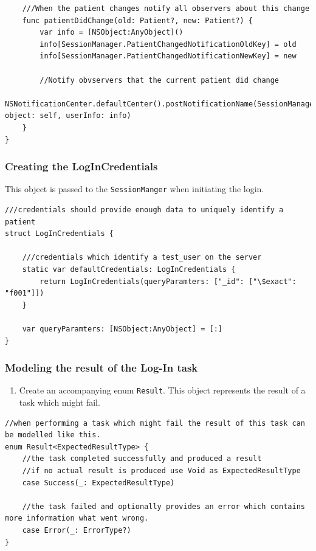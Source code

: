 \documentclass{article}
\begin{document}
\begin{enumerate}
\begin{verbatim}
    ///When the patient changes notify all observers about this change
    func patientDidChange(old: Patient?, new: Patient?) {
        var info = [NSObject:AnyObject]()
        info[SessionManager.PatientChangedNotificationOldKey] = old
        info[SessionManager.PatientChangedNotificationNewKey] = new

        //Notify obvservers that the current patient did change
        NSNotificationCenter.defaultCenter().postNotificationName(SessionManager.PatientChangedNotification, object: self, userInfo: info)
    }
}

\end{verbatim}

\end{enumerate}

\subsubsection{Creating the LogInCredentials}

This object is passed to the \texttt{SessionManger} when initiating the login.

\begin{verbatim}
///credentials should provide enough data to uniquely identify a patient
struct LogInCredentials {

    ///credentials which identify a test_user on the server
    static var defaultCredentials: LogInCredentials {
        return LogInCredentials(queryParamters: ["_id": ["\$exact": "f001"]])
    }

    var queryParamters: [NSObject:AnyObject] = [:]
}
\end{verbatim}

\subsubsection{Modeling the result of the Log-In task}
\begin{enumerate}
\item
  Create an accompanying enum \texttt{Result}. This object represents
  the result of a task which might fail.
\end{enumerate}

\begin{verbatim}
//when performing a task which might fail the result of this task can be modelled like this.
enum Result<ExpectedResultType> {
    //the task completed successfully and produced a result
    //if no actual result is produced use Void as ExpectedResultType
    case Success(_: ExpectedResultType)

    //the task failed and optionally provides an error which contains more information what went wrong.
    case Error(_: ErrorType?)
}
\end{verbatim}
\end{document}
